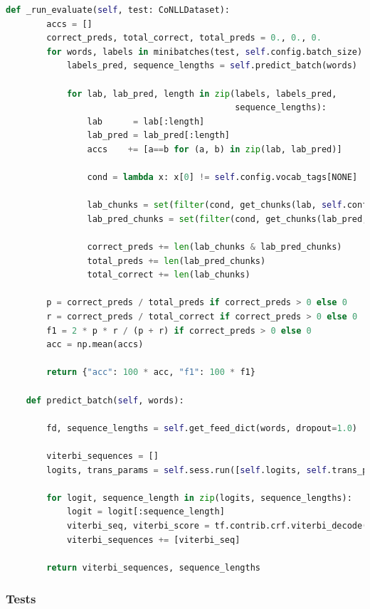 \begin{lstlisting}[language=Python,caption={Test network}]
    def _run_evaluate(self, test: CoNLLDataset):
        accs = []
        correct_preds, total_correct, total_preds = 0., 0., 0.
        for words, labels in minibatches(test, self.config.batch_size):
            labels_pred, sequence_lengths = self.predict_batch(words)

            for lab, lab_pred, length in zip(labels, labels_pred,
                                             sequence_lengths):
                lab      = lab[:length]
                lab_pred = lab_pred[:length]
                accs    += [a==b for (a, b) in zip(lab, lab_pred)]

                cond = lambda x: x[0] != self.config.vocab_tags[NONE]   

                lab_chunks = set(filter(cond, get_chunks(lab, self.config.vocab_tags)))
                lab_pred_chunks = set(filter(cond, get_chunks(lab_pred, self.config.vocab_tags)))

                correct_preds += len(lab_chunks & lab_pred_chunks)
                total_preds += len(lab_pred_chunks)
                total_correct += len(lab_chunks)

        p = correct_preds / total_preds if correct_preds > 0 else 0
        r = correct_preds / total_correct if correct_preds > 0 else 0
        f1 = 2 * p * r / (p + r) if correct_preds > 0 else 0
        acc = np.mean(accs)

        return {"acc": 100 * acc, "f1": 100 * f1}

    def predict_batch(self, words):

        fd, sequence_lengths = self.get_feed_dict(words, dropout=1.0)

        viterbi_sequences = []
        logits, trans_params = self.sess.run([self.logits, self.trans_params], feed_dict=fd)

        for logit, sequence_length in zip(logits, sequence_lengths):
            logit = logit[:sequence_length] 
            viterbi_seq, viterbi_score = tf.contrib.crf.viterbi_decode(logit, trans_params)
            viterbi_sequences += [viterbi_seq]

        return viterbi_sequences, sequence_lengths
\end{lstlisting}

\subsubsection{Tests}

